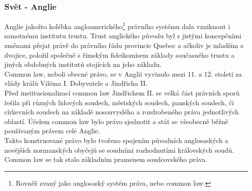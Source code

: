 \documentclass{article}
\begin{document}
\subsubsection{Svět - Anglie}

Anglie jakožto kolébka angloamerického\footnote{Rovněž zvaný jako anglosaský systém práva, nebo common law.} právního systému dala vzniknout i samotnému institutu trustu. Trust anglického původu byl s jistými koncepčními změnami přejat právě do právního řádu provincie Quebec a ačkoliv je mladším z dvojice, položil společně s římským fideikomisem základy současného trustu a jiných obdobných institutů stojících na jeho základu.\\




Common law, neboli obecné právo, se v Anglii vyvinulo mezi 11. a 12. století za vlády králů Viléma I. Dobyvatele a Jindřicha II.\\

Před institucionalizací common law Jindřichem II. se velká část právních sporů řešila při různých lidových soudech, městských soudech, panských soudech, či církevních soudech na základě nosouvyslého a rozdrobeného práva jednotlivých oblastí. Účelem common law bylo právo sjednotit a stát se všeobecně běžně používaným právem celé Anglie.\\

Takto konstruované právo bylo tvořeno spojením původních anglosaských a novějších normanských obyčejů se soudními rozhodnutími královských soudů. Common law se tak stalo základním pramenem soudcovského práva.\\

\end{document}
